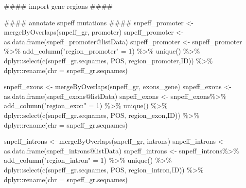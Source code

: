\documentclass[
  letterpaper,
  DIV=11,
  numbers=noendperiod]{scrreprt}
\newenvironment{Shaded}{}{}
\newcommand{\AttributeTok}[1]{\textcolor[rgb]{0.84,0.23,0.29}{#1}}
\newcommand{\DecValTok}[1]{\textcolor[rgb]{0.00,0.36,0.77}{#1}}
\newcommand{\DocumentationTok}[1]{\textcolor[rgb]{0.42,0.45,0.49}{#1}}
\newcommand{\FunctionTok}[1]{\textcolor[rgb]{0.44,0.26,0.76}{#1}}
\newcommand{\NormalTok}[1]{\textcolor[rgb]{0.14,0.16,0.18}{#1}}
\newcommand{\OtherTok}[1]{\textcolor[rgb]{0.44,0.26,0.76}{#1}}
\newcommand{\SpecialCharTok}[1]{\textcolor[rgb]{0.00,0.36,0.77}{#1}}
\newcommand{\StringTok}[1]{\textcolor[rgb]{0.01,0.18,0.38}{#1}}
\begin{document}
\begin{Shaded}
\begin{Highlighting}[]
\DocumentationTok{\#\#\#\# import gene regions \#\#\#\#}

\DocumentationTok{\#\#\#\# annotate snpeff mutations \#\#\#\#}
\NormalTok{snpeff\_promoter }\OtherTok{\textless{}{-}} \FunctionTok{mergeByOverlaps}\NormalTok{(snpeff\_gr, promoter)}
\NormalTok{snpeff\_promoter }\OtherTok{\textless{}{-}} \FunctionTok{as.data.frame}\NormalTok{(snpeff\_promoter}\SpecialCharTok{@}\NormalTok{listData)}
\NormalTok{snpeff\_promoter }\OtherTok{\textless{}{-}}\NormalTok{ snpeff\_promoter }\SpecialCharTok{\%\textgreater{}\%}
  \FunctionTok{add\_column}\NormalTok{(}\StringTok{"region\_promoter"} \OtherTok{=} \DecValTok{1}\NormalTok{) }\SpecialCharTok{\%\textgreater{}\%} \FunctionTok{unique}\NormalTok{() }\SpecialCharTok{\%\textgreater{}\%}\NormalTok{ dplyr}\SpecialCharTok{::}\FunctionTok{select}\NormalTok{(}\FunctionTok{c}\NormalTok{(}\StringTok{\textasciigrave{}}\AttributeTok{snpeff\_gr.seqnames}\StringTok{\textasciigrave{}}\NormalTok{, POS, region\_promoter,ID)) }\SpecialCharTok{\%\textgreater{}\%}\NormalTok{ dplyr}\SpecialCharTok{::}\FunctionTok{rename}\NormalTok{(}\AttributeTok{chr =}\NormalTok{ snpeff\_gr.seqnames)}

\NormalTok{snpeff\_exons }\OtherTok{\textless{}{-}} \FunctionTok{mergeByOverlaps}\NormalTok{(snpeff\_gr, exons\_gene)}
\NormalTok{snpeff\_exons }\OtherTok{\textless{}{-}} \FunctionTok{as.data.frame}\NormalTok{(snpeff\_exons}\SpecialCharTok{@}\NormalTok{listData)}
\NormalTok{snpeff\_exons }\OtherTok{\textless{}{-}}\NormalTok{ snpeff\_exons}\SpecialCharTok{\%\textgreater{}\%}
  \FunctionTok{add\_column}\NormalTok{(}\StringTok{"region\_exon"} \OtherTok{=} \DecValTok{1}\NormalTok{) }\SpecialCharTok{\%\textgreater{}\%} \FunctionTok{unique}\NormalTok{() }\SpecialCharTok{\%\textgreater{}\%}\NormalTok{ dplyr}\SpecialCharTok{::}\FunctionTok{select}\NormalTok{(}\FunctionTok{c}\NormalTok{(snpeff\_gr.seqnames, POS, region\_exon,ID)) }\SpecialCharTok{\%\textgreater{}\%}\NormalTok{ dplyr}\SpecialCharTok{::}\FunctionTok{rename}\NormalTok{(}\AttributeTok{chr =}\NormalTok{ snpeff\_gr.seqnames)}

\NormalTok{snpeff\_introns }\OtherTok{\textless{}{-}} \FunctionTok{mergeByOverlaps}\NormalTok{(snpeff\_gr, introns)}
\NormalTok{snpeff\_introns }\OtherTok{\textless{}{-}} \FunctionTok{as.data.frame}\NormalTok{(snpeff\_introns}\SpecialCharTok{@}\NormalTok{listData)}
\NormalTok{snpeff\_introns }\OtherTok{\textless{}{-}}\NormalTok{ snpeff\_introns}\SpecialCharTok{\%\textgreater{}\%}
  \FunctionTok{add\_column}\NormalTok{(}\StringTok{"region\_intron"} \OtherTok{=} \DecValTok{1}\NormalTok{) }\SpecialCharTok{\%\textgreater{}\%} \FunctionTok{unique}\NormalTok{() }\SpecialCharTok{\%\textgreater{}\%}\NormalTok{ dplyr}\SpecialCharTok{::}\FunctionTok{select}\NormalTok{(}\FunctionTok{c}\NormalTok{(snpeff\_gr.seqnames, POS, region\_intron,ID)) }\SpecialCharTok{\%\textgreater{}\%}\NormalTok{ dplyr}\SpecialCharTok{::}\FunctionTok{rename}\NormalTok{(}\AttributeTok{chr =}\NormalTok{ snpeff\_gr.seqnames)}


\end{Highlighting}
\end{Shaded}
\end{document}
